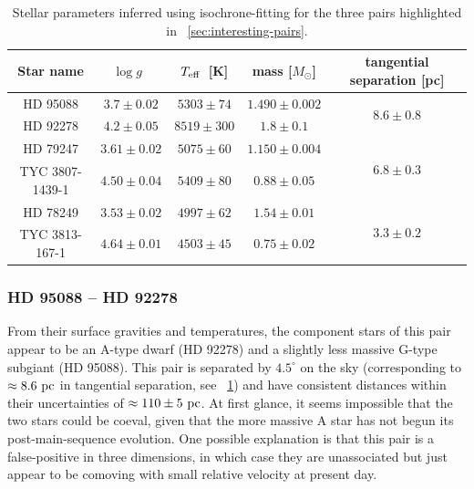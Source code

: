 \documentclass[modern, letterpaper]{aastex61}
\newcommand{\logg}{\ensuremath{\ensuremath{\log g}}}
\newcommand{\teff}{\ensuremath{\ensuremath{T_{\rm eff}}}}
\begin{document}
\begin{table}[ht]
  \begin{center}
    \begin{tabular}{ c | c | c | c | c }
      \toprule
        Star name & \logg\ & \teff\ [K] & mass [$M_\odot$] &
          tangential separation [pc]  \\
        \toprule
        HD 95088 & $3.7 \pm 0.02$ & $5303 \pm 74$ & $1.490 \pm 0.002$ &
          \multirow{2}{*}{$8.6 \pm 0.8$}\\
        HD 92278 & $4.2 \pm 0.05$ & $8519 \pm 300$ & $1.8 \pm 0.1$ &\\
        \midrule
        HD 79247 & $3.61 \pm 0.02$ & $5075 \pm 60$ & $1.150 \pm 0.004$ &
          \multirow{2}{*}{$6.8 \pm 0.3$}\\
        TYC 3807-1439-1 & $4.50 \pm 0.04$ & $5409 \pm 80$ & $0.88 \pm 0.05$ &\\
        \midrule
        HD 78249 & $3.53 \pm 0.02$ & $4997 \pm 62$ & $1.54 \pm 0.01$ &
          \multirow{2}{*}{$3.3 \pm 0.2$}\\
        TYC 3813-167-1 & $4.64 \pm 0.01$ & $4503 \pm 45$ & $0.75 \pm 0.02$ &\\
      \bottomrule
    \end{tabular}
    \caption{
      Stellar parameters inferred using isochrone-fitting for the three pairs
      highlighted in \sectionname~\ref{sec:interesting-pairs}.
      \label{tbl:highlighted-pairs}
    }
  \end{center}
\end{table}

\subsubsection{HD 95088 -- HD 92278}

From their surface gravities and temperatures, the component stars of this pair
appear to be an A-type dwarf (HD 92278) and a slightly less massive G-type
subgiant (HD 95088).
This pair is separated by $4.5^\circ$ on the sky (corresponding to $\approx
8.6~\mathrm{pc}$ in tangential separation, see \tablename~\ref{tbl:highlighted-pairs})
and have consistent distances within their uncertainties of $\approx 110 \pm
5~\mathrm{pc}$.
At first glance, it seems impossible that the two stars could be coeval, given
that the more massive A star has not begun its post-main-sequence evolution.
One possible explanation is that this pair is a false-positive in three
dimensions, in which case they are unassociated but just appear to be comoving
with small relative velocity at present day.
\end{document}
